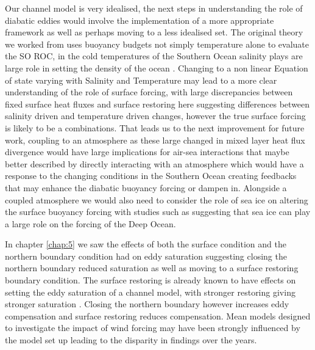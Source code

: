 Our channel model is very idealised, the next steps in understanding the role of diabatic eddies would involve the implementation of a more appropriate framework as well as perhaps moving to a less idealised set. The original theory we worked from uses buoyancy budgets not simply temperature alone to evaluate the SO ROC, in the cold temperatures of the Southern Ocean salinity plays are large role in setting the density of the ocean %
. Changing to a non linear Equation of state varying with Salinity and Temperature may lead to a more clear understanding of the role of surface forcing, with large discrepancies between fixed surface heat fluxes and surface restoring here suggesting differences between salinity driven and temperature driven changes, however the true surface forcing is likely to be a combinations. %
That leads us to the next improvement for future work, coupling to an atmosphere as these large changed in mixed layer heat flux divergence would have large implications for air-sea interactions that maybe better described by directly interacting with an atmosphere which would have a response to the changing conditions in the Southern Ocean creating feedbacks that may enhance the diabatic buoyancy forcing or dampen in. Alongside a coupled atmosphere we would also need to consider the role of sea ice on altering the surface buoyancy forcing with studies such as \cite{Ferreira2014}  %
suggesting that sea ice can play a large role on the forcing of the Deep Ocean. 

In chapter \ref{chap:5} we saw the effects of both the surface condition and the northern boundary condition had on eddy saturation suggesting closing the northern boundary reduced saturation as well as moving to a surface restoring boundary condition. The surface restoring is already known to have effects on setting the eddy saturation of a channel model, with stronger restoring giving stronger saturation \citep{Zhai2014}. Closing the northern boundary however increases eddy compensation and surface restoring reduces compensation. Mean models designed to investigate the impact of wind forcing may have been strongly influenced by the model set up leading to the disparity in findings over the years. 

